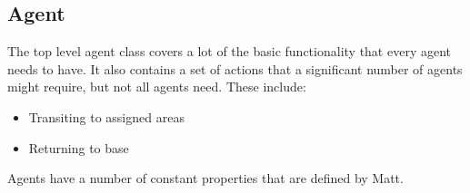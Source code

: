 \documentclass{article}
\begin{document}
\subsection{Agent}
The top level agent class covers a lot of the basic functionality that every agent needs to have. It also contains a set of actions that a significant number of agents might require, but not all agents need. These include: \\

\begin{itemize}
    \item Transiting to assigned areas
    \item Returning to base 
\end{itemize}

\noindent Agents have a number of constant properties that are defined by Matt.
\end{document}
